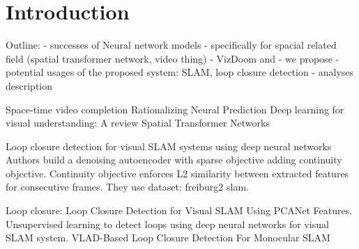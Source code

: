 
\chapter{Introduction}
\label{ch:intro}

Outline:
- successes of Neural network models
- specifically for spacial related field (spatial transformer network, video thing)
- VizDoom and
- we propose
- potential usages of the proposed system: SLAM, loop closure detection
- analyses description

Space-time video completion \cite{Wexler2004}
Rationalizing Neural Prediction \cite{Lei2016}
Deep learning for visual understanding: A review \cite{Guo2016}
Spatial Transformer Networks \cite{Jaderberg2015}

Loop closure detection for visual SLAM systems using deep neural networks \cite{Gao2015}
Authors build a denoising autoencoder with sparse objective adding continuity objective.
Continuity objective enforces L2 similarity between extracted features for consecutive frames. They use dataset: freiburg2 slam.

Loop closure:
Loop Closure Detection for Visual SLAM Using PCANet Features.
Unsupervised learning to detect loops using deep neural networks for visual SLAM system.
VLAD-Based Loop Closure Detection For Monocular SLAM \cite{Xia2016, Gao2015a, Huang2016}
